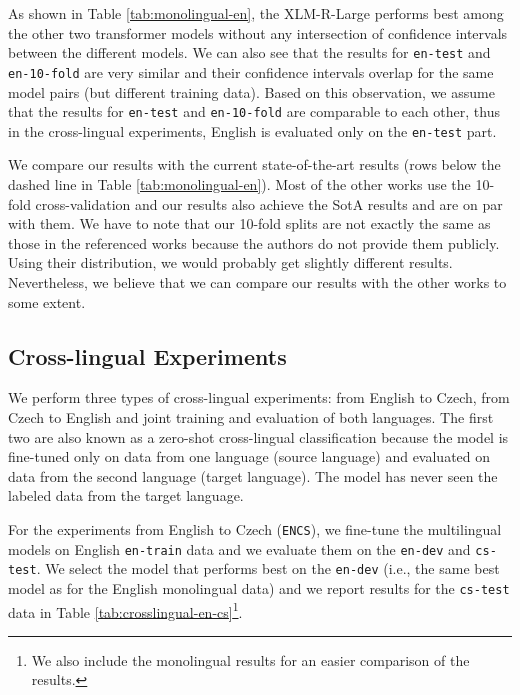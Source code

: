 \documentclass[10pt, a4paper]{article}
\begin{document}
\par As shown in Table \ref{tab:monolingual-en}, the XLM-R-Large performs best among the other two transformer models without any intersection of confidence intervals between the different models. We can also see that the results for \texttt{en-test} and \texttt{en-10-fold} are very similar and their confidence intervals overlap for the same model pairs (but different training data). 
Based on this observation, we assume that the results for \texttt{en-test} and \texttt{en-10-fold} are comparable to each other, thus in the cross-lingual experiments, English is evaluated only on the \texttt{en-test} part. 

\par We compare our results with the current state-of-the-art results (rows below the dashed line in Table \ref{tab:monolingual-en}). Most of the other works use the 10-fold cross-validation and our results also achieve the SotA results and are on par with them. We have to note that our 10-fold splits are not exactly the same as those in the referenced works because the authors do not provide them publicly. Using their distribution, we would probably get slightly different results. Nevertheless, we believe that we can compare our results with the other works to some extent.




\subsection{Cross-lingual Experiments}
We perform three types of cross-lingual experiments: from English to Czech, from Czech to English and joint training and evaluation of both languages. The first two are also known as a zero-shot cross-lingual classification because the model is fine-tuned only on data from one language (source language) and evaluated on data from the second language (target language). The model has never seen the labeled data from the target language.

\par For the experiments from English to Czech (\texttt{ENCS}), we fine-tune the multilingual models on English \texttt{en-train} data and we evaluate them on the \texttt{en-dev} and \texttt{cs-test}. We select the model that performs best on the \texttt{en-dev} (i.e., the same best model as for the English monolingual data) and we report results for the \texttt{cs-test} data in Table \ref{tab:crosslingual-en-cs}\footnote{We also include the monolingual results for an easier comparison of the results.}.
\end{document}
